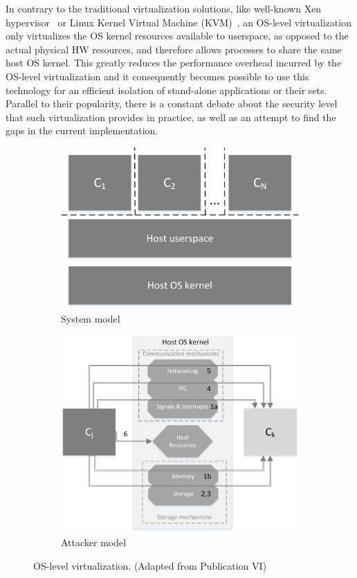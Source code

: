 In contrary to the traditional virtualization solutions, like well-known Xen hypervisor~\cite{xenproject} or Linux Kernel Virtual Machine (KVM)~\cite{kvmproject}, an OS-level virtualization only virtualizes the OS kernel resources available to userspace, as opposed to the actual physical HW resources, and therefore allows processes to share the same host OS kernel. This greatly reduces the performance overhead incurred by the OS-level virtualization and it consequently becomes possible to use this technology for an efficient isolation of stand-alone applications or their sets. Parallel to their popularity, there is a constant debate about the security level that such virtualization provides in practice, as well as an attempt to find the gaps in the current implementation. 


\begin{figure}[t]
\centering
\begin{subfigure}{.5\textwidth}
  \centering
  \includegraphics[width=0.8\linewidth]{figures/os-virtualization-sys-model.png}
  \caption{System model}
  \label{fig:osv-1}
\end{subfigure}%
\begin{subfigure}{.5\textwidth}
  \centering
  \includegraphics[width=1\linewidth]{figures/OS-virtualization-attacker-model.png}
  \caption{Attacker model}
  \label{fig:osv-2}
\end{subfigure}
\caption{OS-level virtualization. (Adapted from Publication VI)}
\label{fig:os-virtualization}
\end{figure}

